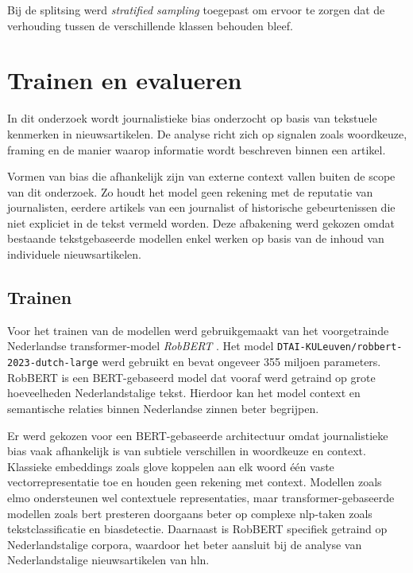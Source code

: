 Bij de splitsing werd \textit{stratified sampling} toegepast om ervoor te zorgen dat de verhouding tussen de verschillende klassen behouden bleef.

\section{Trainen en evalueren}
\label{sec:trainen-en-evalueren}

In dit onderzoek wordt journalistieke bias onderzocht op basis van tekstuele kenmerken in nieuwsartikelen. De analyse richt zich op signalen zoals woordkeuze, framing en de manier waarop informatie wordt beschreven binnen een artikel.

Vormen van bias die afhankelijk zijn van externe context vallen buiten de scope van dit onderzoek. Zo houdt het model geen rekening met de reputatie van journalisten, eerdere artikels van een journalist of historische gebeurtenissen die niet expliciet in de tekst vermeld worden. Deze afbakening werd gekozen omdat bestaande tekstgebaseerde modellen enkel werken op basis van de inhoud van individuele nieuwsartikelen.

\subsection{Trainen}

Voor het trainen van de modellen werd gebruikgemaakt van het voorgetrainde Nederlandse transformer-model \textit{RobBERT} \autocite{Delobelle2020}. Het model \texttt{DTAI-KULeuven/robbert-2023-dutch-large} werd gebruikt en bevat ongeveer 355 miljoen parameters. RobBERT is een BERT-gebaseerd model dat vooraf werd getraind op grote hoeveelheden Nederlandstalige tekst. Hierdoor kan het model context en semantische relaties binnen Nederlandse zinnen beter begrijpen.

Er werd gekozen voor een BERT-gebaseerde architectuur omdat journalistieke bias vaak afhankelijk is van subtiele verschillen in woordkeuze en context. Klassieke embeddings zoals \gls{glove} koppelen aan elk woord één vaste vectorrepresentatie toe en houden geen rekening met context. Modellen zoals \gls{elmo} ondersteunen wel contextuele representaties, maar transformer-gebaseerde modellen zoals \gls{bert} presteren doorgaans beter op complexe \gls{nlp}-taken zoals tekstclassificatie en biasdetectie. Daarnaast is RobBERT specifiek getraind op Nederlandstalige corpora, waardoor het beter aansluit bij de analyse van Nederlandstalige nieuwsartikelen van \gls{hln}.

